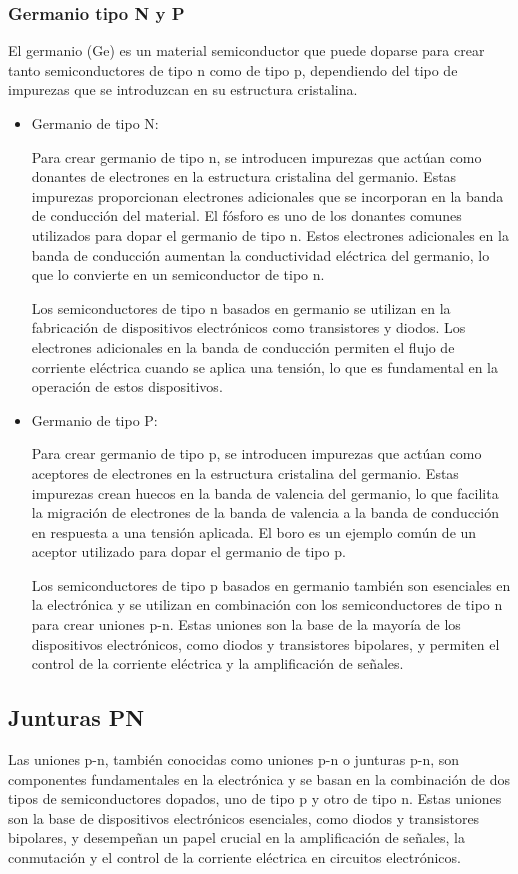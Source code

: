 \documentclass[10.5pt]{article}
\begin{document}
    \subsubsection{Germanio tipo N y P}
    El germanio (Ge) es un material semiconductor que puede doparse para crear tanto semiconductores de tipo n como de tipo p, dependiendo del tipo de impurezas que se introduzcan en su estructura cristalina.
    \begin{itemize}
        \item Germanio de tipo N:

        Para crear germanio de tipo n, se introducen impurezas que actúan como donantes de electrones en la estructura cristalina del germanio. Estas impurezas proporcionan electrones adicionales que se incorporan en la banda de conducción del material. El fósforo es uno de los donantes comunes utilizados para dopar el germanio de tipo n. Estos electrones adicionales en la banda de conducción aumentan la conductividad eléctrica del germanio, lo que lo convierte en un semiconductor de tipo n.
        
        Los semiconductores de tipo n basados en germanio se utilizan en la fabricación de dispositivos electrónicos como transistores y diodos. Los electrones adicionales en la banda de conducción permiten el flujo de corriente eléctrica cuando se aplica una tensión, lo que es fundamental en la operación de estos dispositivos.
        \item Germanio de tipo P:

        Para crear germanio de tipo p, se introducen impurezas que actúan como aceptores de electrones en la estructura cristalina del germanio. Estas impurezas crean huecos en la banda de valencia del germanio, lo que facilita la migración de electrones de la banda de valencia a la banda de conducción en respuesta a una tensión aplicada. El boro es un ejemplo común de un aceptor utilizado para dopar el germanio de tipo p.
        
        Los semiconductores de tipo p basados en germanio también son esenciales en la electrónica y se utilizan en combinación con los semiconductores de tipo n para crear uniones p-n. Estas uniones son la base de la mayoría de los dispositivos electrónicos, como diodos y transistores bipolares, y permiten el control de la corriente eléctrica y la amplificación de señales.
    \end{itemize}
    \subsection{Junturas PN}
    Las uniones p-n, también conocidas como uniones p-n o junturas p-n, son componentes fundamentales en la electrónica y se basan en la combinación de dos tipos de semiconductores dopados, uno de tipo p y otro de tipo n. Estas uniones son la base de dispositivos electrónicos esenciales, como diodos y transistores bipolares, y desempeñan un papel crucial en la amplificación de señales, la conmutación y el control de la corriente eléctrica en circuitos electrónicos.
\end{document}
